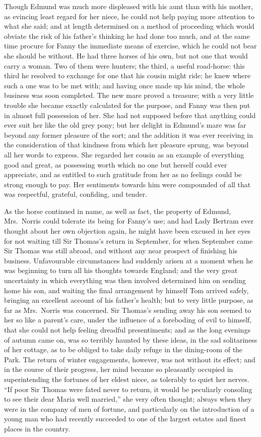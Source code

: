 Though Edmund was much more displeased with his aunt than
with his mother, as evincing least regard for her niece,
he could not help paying more attention to what she said;
and at length determined on a method of proceeding
which would obviate the risk of his father's thinking he
had done too much, and at the same time procure for Fanny
the immediate means of exercise, which he could not bear
she should be without.  He had three horses of his own,
but not one that would carry a woman.  Two of them
were hunters; the third, a useful road-horse: this third he
resolved to exchange for one that his cousin might ride;
he knew where such a one was to be met with; and having once
made up his mind, the whole business was soon completed.
The new mare proved a treasure; with a very little
trouble she became exactly calculated for the purpose,
and Fanny was then put in almost full possession of her.
She had not supposed before that anything could ever suit
her like the old grey pony; but her delight in Edmund's
mare was far beyond any former pleasure of the sort;
and the addition it was ever receiving in the consideration
of that kindness from which her pleasure sprung,
was beyond all her words to express.  She regarded
her cousin as an example of everything good and great,
as possessing worth which no one but herself could
ever appreciate, and as entitled to such gratitude
from her as no feelings could be strong enough to pay.
Her sentiments towards him were compounded of all that
was respectful, grateful, confiding, and tender.

As the horse continued in name, as well as fact,
the property of Edmund, Mrs.\ Norris could tolerate its being
for Fanny's use; and had Lady Bertram ever thought about
her own objection again, he might have been excused in her
eyes for not waiting till Sir Thomas's return in September,
for when September came Sir Thomas was still abroad,
and without any near prospect of finishing his business.
Unfavourable circumstances had suddenly arisen at a moment
when he was beginning to turn all his thoughts towards England;
and the very great uncertainty in which everything was then
involved determined him on sending home his son, and waiting
the final arrangement by himself Tom arrived safely,
bringing an excellent account of his father's health;
but to very little purpose, as far as Mrs.\ Norris
was concerned.  Sir Thomas's sending away his son seemed
to her so like a parent's care, under the influence of a
foreboding of evil to himself, that she could not help
feeling dreadful presentiments; and as the long evenings
of autumn came on, was so terribly haunted by these ideas,
in the sad solitariness of her cottage, as to be obliged
to take daily refuge in the dining-room of the Park.
The return of winter engagements, however, was not
without its effect; and in the course of their progress,
her mind became so pleasantly occupied in superintending
the fortunes of her eldest niece, as tolerably to quiet
her nerves.  ``If poor Sir Thomas were fated never to return,
it would be peculiarly consoling to see their dear Maria
well married,'' she very often thought; always when they
were in the company of men of fortune, and particularly on
the introduction of a young man who had recently succeeded
to one of the largest estates and finest places in the country.

